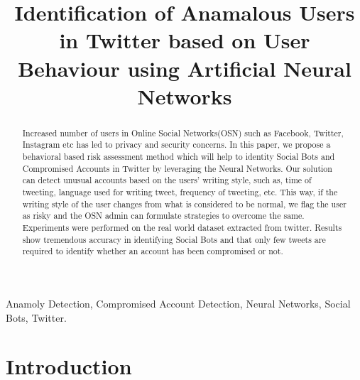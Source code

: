 \documentclass[conference]{IEEEtran}
\begin{document}
\title{Identification of Anamalous Users in Twitter based on User Behaviour using Artificial Neural Networks}

\author{
	\and
}

\maketitle

\begin{abstract}

Increased number of users in Online Social Networks(OSN) such as Facebook, Twitter, Instagram etc has led to privacy and security concerns. In this paper, we propose a behavioral based risk assessment method which will help to identity Social Bots and Compromised Accounts in Twitter by leveraging the Neural Networks.
Our solution can detect unusual accounts based on the users' writing style, such as, time of tweeting, language used for writing tweet, frequency of tweeting, etc. This way, if the writing style of the user changes 
from what is considered to be normal, we flag the user as risky and the OSN admin can formulate strategies to overcome the same. Experiments were performed 
on the real world dataset extracted from twitter. Results show tremendous accuracy in identifying Social Bots and that only few tweets are required to identify whether an account has been compromised or not.

\end{abstract}

\begin{IEEEkeywords}

Anamoly Detection, Compromised Account Detection, Neural Networks, Social Bots, Twitter.

\end{IEEEkeywords}

\section{Introduction}
\end{document}
